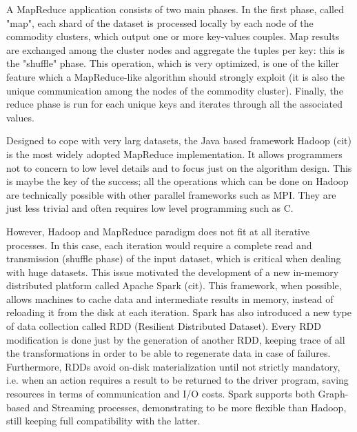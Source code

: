 A MapReduce application consists of two main phases. In the first phase, called "map", each shard of the dataset is processed locally by each node of the commodity clusters, which output one or more key-values couples. Map results are exchanged among the cluster nodes and aggregate the tuples per key: this is the "shuffle" phase. This operation, which is very optimized, is one of the killer feature which a MapReduce-like algorithm should strongly exploit (it is also the unique communication among the nodes of the commodity cluster). Finally, the reduce phase is run for each unique keys and iterates through all the associated values.

Designed to cope with very larg datasets, the Java based framework Hadoop (cit) is the most widely adopted MapReduce implementation. It allows programmers not to concern to low level details and to focus just on the algorithm design. This is maybe the key of the success; all the operations which can be done on Hadoop are technically possible with other parallel frameworks such as MPI. They are just less trivial and often requires low level programming such as C.

However, Hadoop and MapReduce paradigm does not fit at all iterative processes. In this case, each iteration would require a complete read and transmission (shuffle phase) of the input dataset, which is critical when dealing with huge datasets. This issue motivated the development of a new in-memory distributed platform called Apache Spark (cit). This framework, when possible, allows machines to cache data and intermediate results in memory, instead of reloading it from the disk at each iteration. Spark has also introduced a new type of data collection called RDD (Resilient Distributed Dataset). Every RDD modification is done just by the generation of another RDD, keeping trace of all the transformations in order to be able to regenerate data in case of failures. Furthermore, RDDs avoid on-disk materialization until not strictly mandatory, i.e. when an action requires a result to be returned to the driver program, saving resources in terms of communication and I/O costs. Spark supports both Graph-based and Streaming processes, demonstrating to be more flexible than Hadoop, still keeping full compatibility with the latter.


